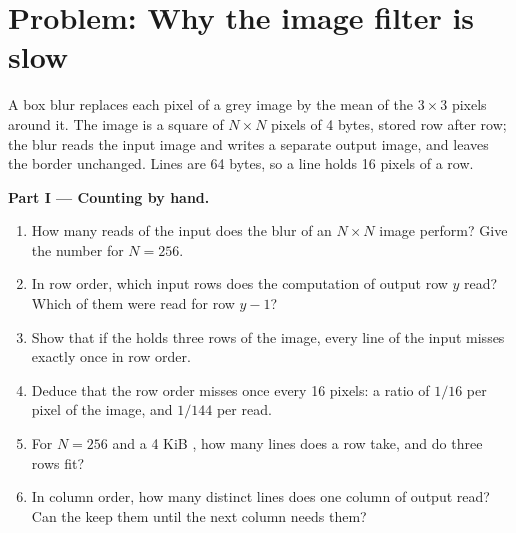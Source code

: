 \section{Problem: Why the image filter is slow}\label{sec:b2:caches:problem}

\begin{problem}\label{pb:b2:caches:1}
A box blur replaces each pixel of a grey image by the mean of the $3 \times 3$ pixels around it. The image is a
square of $N \times N$ pixels of 4 bytes, stored row after row; the blur reads the input image and writes a separate
output image, and leaves the border unchanged. Lines are 64 bytes, so a line holds 16 pixels of a row.

\medskip\noindent\textbf{Part I --- Counting by hand.}\par\nopagebreak
\begin{enumerate}
\item How many reads of the input does the blur of an $N \times N$ image perform? Give the number for $N = 256$.
\item In row order, which input rows does the computation of output row $y$ read? Which of them were read for row
$y - 1$?
\item Show that if the  holds three rows of the image, every line of the input misses exactly once in row order.
\item Deduce that the row order misses once every 16 pixels: a  ratio of $1/16$ per pixel of the image, and
$1/144$ per read.
\item For $N = 256$ and a 4 KiB , how many lines does a row take, and do three rows fit?
\item In column order, how many distinct lines does one column of output read? Can the  keep them until the next
column needs them?
\end{enumerate}


\end{problem}
